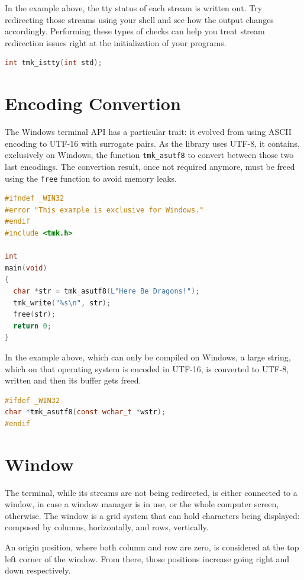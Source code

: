 \documentclass{report}
\begin{document}
In the example above, the tty status of each stream is written out. Try redirecting those streams using your shell and see how the output changes accordingly. Performing these types of checks can help you treat stream redirection issues right at the initialization of your programs.
\begin{lstlisting}[language=c,caption=the declaration of the \texttt{tmk\_istty} function.]
int tmk_istty(int std);
\end{lstlisting}
\section{Encoding Convertion}
The Windows terminal API has a particular trait: it evolved from using ASCII encoding to UTF-16 with surrogate pairs. As the library uses UTF-8, it contains, exclusively on Windows, the function \texttt{tmk\_asutf8} to convert between those two last encodings. The convertion result, once not required anymore, must be freed using the \texttt{free} function to avoid memory leaks.
\begin{lstlisting}[language=c,caption=an example that converts an UTF-16 encoded string to UTF-8.]
#ifndef _WIN32
#error "This example is exclusive for Windows."
#endif
#include <tmk.h>

int
main(void)
{
  char *str = tmk_asutf8(L"Here Be Dragons!");
  tmk_write("%s\n", str);
  free(str);
  return 0;
}
\end{lstlisting}

In the example above, which can only be compiled on Windows, a large string, which on that operating system is encoded in UTF-16, is converted to UTF-8, written and then its buffer gets freed.
\begin{lstlisting}[language=c,caption=the declaration of the \texttt{tmk\_asutf8} function.]
#ifdef _WIN32
char *tmk_asutf8(const wchar_t *wstr);
#endif
\end{lstlisting}
\section{Window}
The terminal, while its streams are not being redirected, is either connected to a window, in case a window manager is in use, or the whole computer screen, otherwise. The window is a grid system that can hold characters being displayed: composed by columns, horizontally, and rows, vertically.

An origin position, where both column and row are zero, is considered at the top left corner of the window. From there, those positions increase going right and down respectively.
\end{document}

